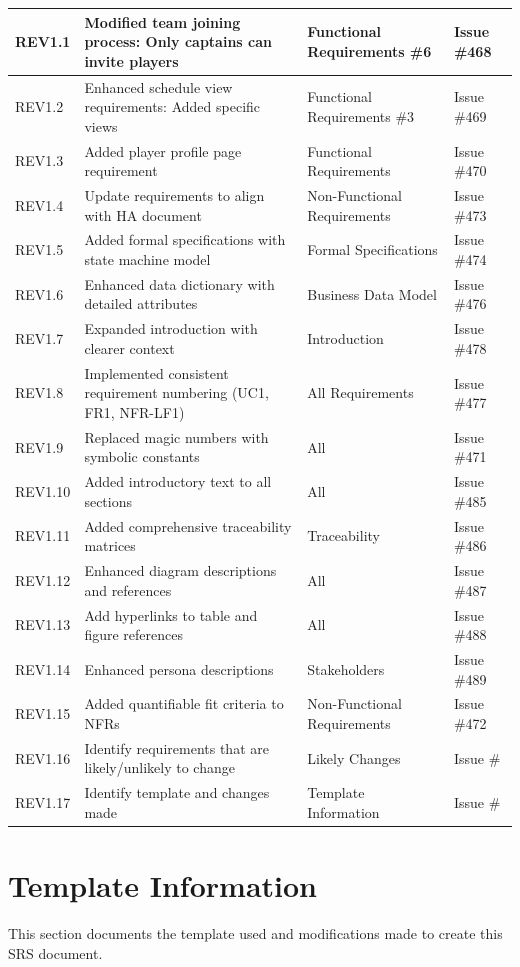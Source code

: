 \documentclass[12pt, titlepage]{article}
\begin{document}
\begin{longtable}{|p{}|p{}|p{}|p{}|}
REV1.1 & Modified team joining process: Only captains can invite players & Functional Requirements \#6 & Issue \#468 \\
\hline
REV1.2 & Enhanced schedule view requirements: Added specific views & Functional Requirements \#3 & Issue \#469 \\
\hline
REV1.3 & Added player profile page requirement & Functional Requirements & Issue \#470 \\
\hline
REV1.4 & Update requirements to align with HA document & Non-Functional Requirements & Issue \#473 \\
\hline
REV1.5 & Added formal specifications with state machine model & Formal Specifications & Issue \#474 \\
\hline
REV1.6 & Enhanced data dictionary with detailed attributes & Business Data Model & Issue \#476 \\
\hline
REV1.7 & Expanded introduction with clearer context & Introduction & Issue \#478 \\
\hline
REV1.8 & Implemented consistent requirement numbering (UC1, FR1, NFR-LF1) & All Requirements & Issue \#477 \\
\hline
REV1.9 & Replaced magic numbers with symbolic constants & All & Issue \#471 \\
\hline
REV1.10 & Added introductory text to all sections & All & Issue \#485 \\
\hline
REV1.11 & Added comprehensive traceability matrices & Traceability & Issue \#486 \\
\hline
REV1.12 & Enhanced diagram descriptions and references & All & Issue \#487 \\
\hline
REV1.13 & Add hyperlinks to table and figure references & All & Issue \#488 \\
\hline
REV1.14 & Enhanced persona descriptions & Stakeholders & Issue \#489 \\
\hline
REV1.15 & Added quantifiable fit criteria to NFRs & Non-Functional Requirements & Issue \#472 \\
\hline
REV1.16 & Identify requirements that are likely/unlikely to change & Likely Changes & Issue \# \\
\hline
REV1.17 & Identify template and changes made & Template Information & Issue \# \\
\hline
\end{longtable}

\section{Template Information}
This section documents the template used and modifications made to create this SRS document.
\end{document}
